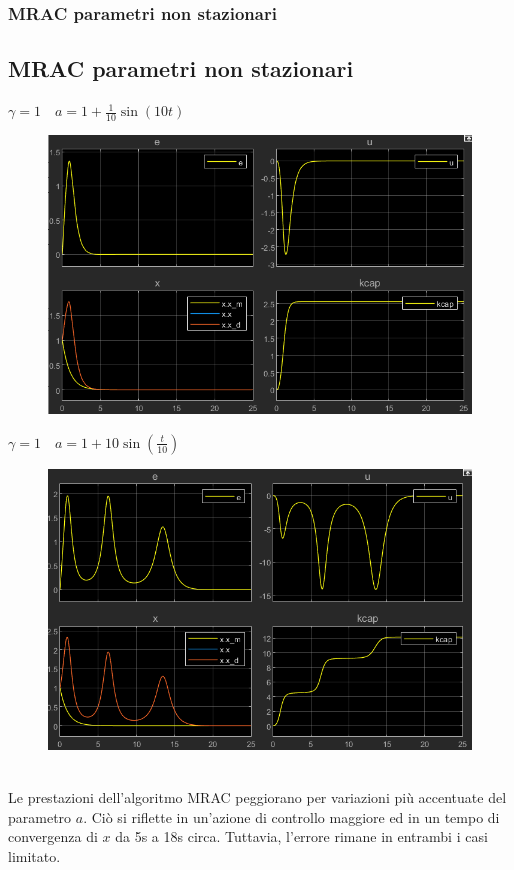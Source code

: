 \documentclass{beamer}
\begin{document}
\begin{frame}
	\frametitle{MRAC parametri non stazionari}
	\subsection{MRAC parametri non stazionari}
	\begin{minipage}[t]{0.45\textwidth}
		\textbf{\(\gamma=1\quad a=1+\frac{1}{10}\sin{(10t)}\)}
		\begin{figure}
			\includegraphics[scale=0.25]{2022-05-20-12-52-05.png} %
		\end{figure}
	\end{minipage}
	\begin{minipage}[t]{0.45\textwidth}
		\textbf{\(\gamma=1\quad a=1+10\sin{(\frac{t}{10})}\)}
		\begin{figure}
			\includegraphics[scale=0.25]{2022-05-20-12-55-10.png} %
		\end{figure}
	\end{minipage}
	\vspace{0.1cm}\\
		Le prestazioni dell'algoritmo MRAC peggiorano per variazioni più accentuate del parametro \(a\). Ciò si riflette in un'azione di controllo maggiore ed in un tempo di convergenza di \(x\) da 5s a 18s circa. Tuttavia, l'errore rimane in entrambi i casi limitato.
\end{frame}
\end{document}
